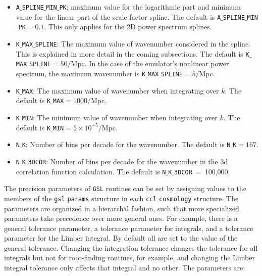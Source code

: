 \documentclass[\docopts]{\docclass}
\begin{document}
\begin{itemize}
\item {\tt A$\_$SPLINE$\_$MIN$\_$PK}: maximum value for the logarithmic part and minimum value for the linear part of the scale factor spline. The default is {\tt A$\_$SPLINE$\_$MIN$\_$PK}$=0.1$. This only applies for the 2D power spectrum splines.
\item {\tt K$\_$MAX$\_$SPLINE}: The maximum value of wavenumber considered in the spline. This is explained in more detail in the coming subsections. The default is {\tt K$\_$MAX$\_$SPLINE}$=50/$Mpc. In the case of the emulator's nonlinear power spectrum, the maximum wavenumber is {\tt K$\_$MAX$\_$SPLINE}$=5/$Mpc.
\item {\tt K$\_$MAX}: The maximum value of wavenumber when integrating over $k$. The default is {\tt K$\_$MAX}$=1000$/Mpc.
\item {\tt K$\_$MIN}:  The minimum value of wavenumber when integrating over $k$. The default is {\tt K$\_$MIN}$=5 \times 10^{-5}$/Mpc.
\item {\tt N$\_$K}: Number of bins per decade for the wavenumber. The default is {\tt N$\_$K}$=167$.
\item {\tt N$\_$K$\_$3DCOR}: Number of bins per decade for the wavenumber in the 3d correlation function calculation.
The default is {\tt N$\_$K$\_$3DCOR}~=~100,000.
\end{itemize}

The precision parameters of {\tt GSL} routines can be set by assigning values to the members of the {\tt gsl$\_$params} structure in each {\tt ccl$\_$cosmology} structure. The parameters are organized in a hierarchal fashion, such that more specialized parameters take precedence over more general ones. For example, there is a general tolerance parameter, a tolerance parameter for integrals, and a tolerance parameter for the Limber integral. By default all are set to the value of the general tolerance. Changing the integration tolerance changes the tolerance for all integrals but not for root-finding routines, for example, and changing the Limber integral tolerance only affects that integral and no other.
The parameters are:
\end{document}
